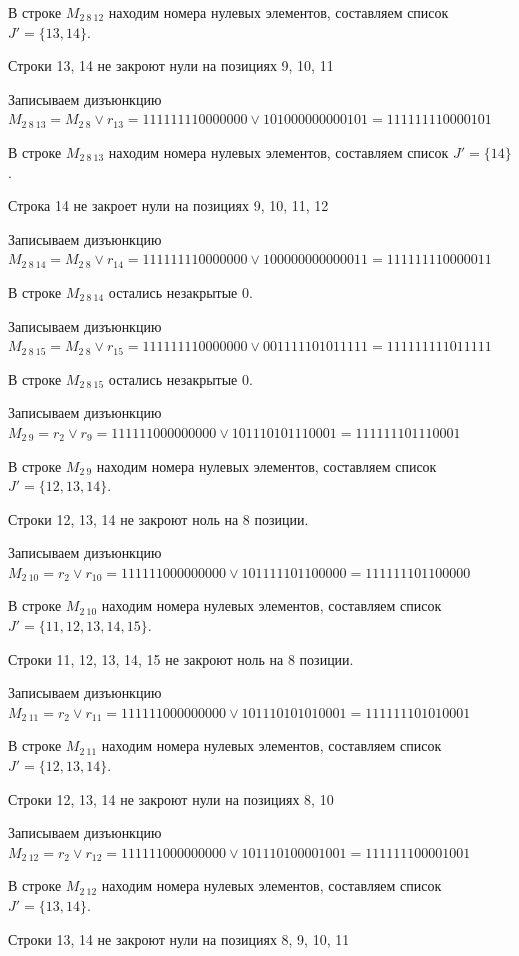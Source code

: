 \documentclass{article}
\begin{document}
В строке $M_{2\ 8\ 12}$ находим номера нулевых элементов, составляем список $J' = \{13, 14\}$.

Строки 13, 14 не закроют нули на позициях 9, 10, 11

Записываем дизъюнкцию $M_{2\ 8\ 13} = M_{2\ 8}\lor r_{13} = 111111110000000 \lor 101000000000101 = 111111110000101$

В строке $M_{2\ 8\ 13}$ находим номера нулевых элементов, составляем список $J' = \{14\}$.

Строка 14 не закроет нули на позициях 9, 10, 11, 12

Записываем дизъюнкцию $M_{2\ 8\ 14} = M_{2\ 8}\lor r_{14} = 111111110000000 \lor 100000000000011 = 111111110000011$

В строке $M_{2\ 8\ 14}$ остались незакрытые 0.

Записываем дизъюнкцию $M_{2\ 8\ 15} = M_{2\ 8}\lor r_{15} = 111111110000000 \lor 001111101011111 = 111111111011111$

В строке $M_{2\ 8\ 15}$ остались незакрытые 0.

Записываем дизъюнкцию $M_{2\ 9} = r_{2}\lor r_{9} = 111111000000000 \lor 101110101110001 = 111111101110001$

В строке $M_{2\ 9}$ находим номера нулевых элементов, составляем список $J' = \{12, 13, 14\}$.

Строки 12, 13, 14 не закроют ноль на 8 позиции.

Записываем дизъюнкцию $M_{2\ 10} = r_{2}\lor r_{10} = 111111000000000 \lor 101111101100000 = 111111101100000$

В строке $M_{2\ 10}$ находим номера нулевых элементов, составляем список $J' = \{11, 12, 13, 14, 15\}$.

Строки 11, 12, 13, 14, 15 не закроют ноль на 8 позиции.

Записываем дизъюнкцию $M_{2\ 11} = r_{2}\lor r_{11} = 111111000000000 \lor 101110101010001 = 111111101010001$

В строке $M_{2\ 11}$ находим номера нулевых элементов, составляем список $J' = \{12, 13, 14\}$.

Строки 12, 13, 14 не закроют нули на позициях 8, 10

Записываем дизъюнкцию $M_{2\ 12} = r_{2}\lor r_{12} = 111111000000000 \lor 101110100001001 = 111111100001001$

В строке $M_{2\ 12}$ находим номера нулевых элементов, составляем список $J' = \{13, 14\}$.

Строки 13, 14 не закроют нули на позициях 8, 9, 10, 11
\end{document}
